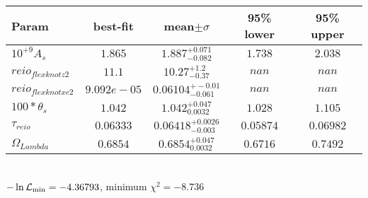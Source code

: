 \begin{tabular}{|l|c|c|c|c|} 
 \hline 
Param & best-fit & mean$\pm\sigma$ & 95\% lower & 95\% upper \\ \hline 
$10^{+9}A_{s }$ &$1.865$ & $1.887_{-0.082}^{+0.071}$ & $1.738$ & $2.038$ \\ 
$reio_{flexknot z  2 }$ &$11.1$ & $10.27_{-0.37}^{+1.2}$ & $nan$ & $nan$ \\ 
$reio_{flexknot xe  2 }$ &$9.092e-05$ & $0.06104_{-0.061}^{+-0.01}$ & $nan$ & $nan$ \\ 
$100*\theta{}_{s }$ &$1.042$ & $1.042_{0.0032}^{+0.047}$ & $1.028$ & $1.105$ \\ 
$\tau{}_{reio }$ &$0.06333$ & $0.06418_{-0.003}^{+0.0026}$ & $0.05874$ & $0.06982$ \\ 
$\Omega{}_{Lambda }$ &$0.6854$ & $0.6854_{0.0032}^{+0.047}$ & $0.6716$ & $0.7492$ \\ 
\hline 
 \end{tabular} \\ 
$-\ln{\cal L}_\mathrm{min} =-4.36793$, minimum $\chi^2=-8.736$ \\ 
